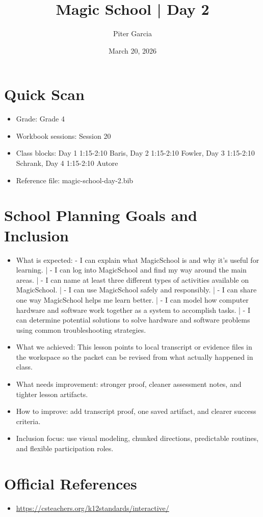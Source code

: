 \documentclass[11pt]{article}
\title{Magic School | Day 2}
\author{Piter Garcia}
\date{March 20, 2026}
\begin{document}
\maketitle
\section*{Quick Scan}
\begin{itemize}[leftmargin=*]
\item Grade: Grade 4
\item Workbook sessions: Session 20
\item Class blocks: Day 1 1:15-2:10 Baris, Day 2 1:15-2:10 Fowler, Day 3 1:15-2:10 Schrank, Day 4 1:15-2:10 Autore
\item Reference file: magic-school-day-2.bib
\end{itemize}
\section*{School Planning Goals and Inclusion}
\begin{itemize}[leftmargin=*]
\item What is expected: - I can explain what MagicSchool is and why it's useful for learning. | - I can log into MagicSchool and find my way around the main areas. | - I can name at least three different types of activities available on MagicSchool. | - I can use MagicSchool safely and responsibly. | - I can share one way MagicSchool helps me learn better. | - I can model how computer hardware and software work together as a system to accomplish tasks. | - I can determine potential solutions to solve hardware and software problems using common troubleshooting strategies.
\item What we achieved: This lesson points to local transcript or evidence files in the workspace so the packet can be revised from what actually happened in class.
\item What needs improvement: stronger proof, cleaner assessment notes, and tighter lesson artifacts.
\item How to improve: add transcript proof, one saved artifact, and clearer success criteria.
\item Inclusion focus: use visual modeling, chunked directions, predictable routines, and flexible participation roles.
\end{itemize}
\section*{Official References}
\begin{itemize}[leftmargin=*]
\item \url{https://csteachers.org/k12standards/interactive/}

\end{itemize}
\end{document}
